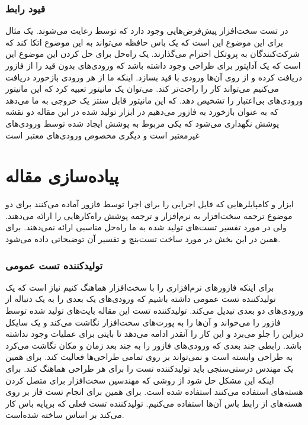 \documentclass[conference]{IEEEtran}
\begin{document}
\subsubsection{قیود رابط}
در تست سخت‌افزار پیش‌فرض‌هایی وجود دارد که توسط
رعایت می‌شوند.
یک مثال برای این موضوع این است که یک باس حافظه می‌تواند به این موضوع اتکا
کند که شرکت‌کنندگان به پروتکل احترام می‌گذارند.
یک راه‌‌حل برای حل کردن این موضوع این است که یک آداپتور برای طراحی وجود داشته باشد
که ورودی‌های بدون قید را از فازور دریافت کرده و از روی آن‌ها ورودی با قید بسازد.
اینکه ما از هر ورودی بازخورد دریافت می‌کنیم می‌تواند کار را راحت‌تر کند.
می‌توان یک مانیتور تعبیه کرد که این مانیتور ورودی‌های بی‌اعتبار را تشخیص دهد.
که این مانیتور قابل سنتز یک خروجی
به ما می‌دهد که به عنوان بازخورد به فازور می‌دهیم
در ابزار تولید شده در این مقاله دو نقشه پوشش نگهداری می‌شود که یکی مربوط به پوشش
ایجاد شده توسط ورودی‌های غیرمعتبر است و دیگری مخصوص ورودی‌های معتبر است
\section{پیاده‌سازی مقاله
}
ابزار
و کامپایلر‌هایی که فایل اجرایی را برای اجرا توسط فازور آماده می‌کنند برای دو موضوع
ترجمه سخت‌افزار به نرم‌افزار و ترجمه پوشش راه‌کار‌هایی را ارائه می‌دهند.
ولی در مورد تفسیر تست‌های تولید شده به ما راه‌حل مناسبی ارائه نمی‌دهند.
برای همین در این بخش در مورد ساخت تست‌بنچ و تفسیر آن توضیحاتی داده می‌شود.
\subsubsection{تولید‌کننده تست عمومی}
برای اینکه فازور‌های نرم‌افزاری را با سخت‌افزار هماهنگ کنیم نیاز است که یک تولید‌کننده تست عمومی
داشته باشیم که ورودی‌های یک بعدی را به یک دنباله از ورودی‌های دو بعدی تبدیل می‌کند.
تولید‌کننده تست این مقاله بایت‌های تولید شده توسط فازور را می‌خواند و آن‌ها را به پورت‌های
سخت‌افزار نگاشت می‌کند و یک سایکل دیزاین را جلو می‌برد و  این کار را آنقدر ادامه می‌دهد
تا بایتی برای عملیات وجود نداشته باشد.
رابطی چند بعدی که ورودی‌های فازور را به چند بعد زمان و مکان نگاشت می‌کرد
به طراحی وابسته است و نمی‌تواند بر روی تمامی طراحی‌ها فعالیت کند.
برای همین یک مهندس درستی‌سنجی باید تولید‌کننده تست را برای هر طراحی هماهنگ کند.
برای اینکه این مشکل حل شود از روشی که مهندسین سخت‌افزار برای متصل کردن هسته‌های
\cite{opentitan}
استفاده می‌کنند استفاده شده است.
برای همین برای انجام تست فاز بر روی هسته‌های
از رابط باس آن‌ها استفاده می‌کنیم.
تولید‌کننده تست فعلی که برپایه باس کار می‌کند بر اساس
ساخته شده‌است.
\cite{tilelink}
\end{document}
